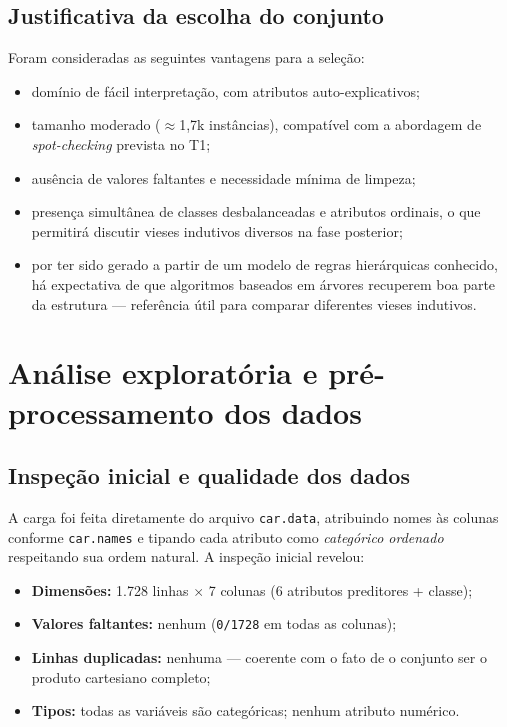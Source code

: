 \documentclass[11pt,a4paper]{article}
\newcommand{\code}[1]{\texttt{\small #1}}
\begin{document}
\subsection{Justificativa da escolha do conjunto}
Foram consideradas as seguintes vantagens para a seleção:
\begin{itemize}
\item domínio de fácil interpretação, com atributos auto-explicativos;
\item tamanho moderado ($\approx$1,7k instâncias), compatível com a abordagem de \textit{spot-checking} prevista no T1;
\item ausência de valores faltantes e necessidade mínima de limpeza;
\item presença simultânea de classes desbalanceadas e atributos ordinais, o que permitirá discutir vieses indutivos diversos na fase posterior;
\item por ter sido gerado a partir de um modelo de regras hierárquicas conhecido, há expectativa de que algoritmos baseados em árvores recuperem boa parte da estrutura --- referência útil para comparar diferentes vieses indutivos.
\end{itemize}

\section{Análise exploratória e pré-processamento dos dados}

\subsection{Inspeção inicial e qualidade dos dados}

A carga foi feita diretamente do arquivo \code{car.data}, atribuindo nomes às colunas conforme \code{car.names} e tipando cada atributo como \emph{categórico ordenado} respeitando sua ordem natural. A inspeção inicial revelou:

\begin{itemize}
\item \textbf{Dimensões:} 1.728 linhas $\times$ 7 colunas (6 atributos preditores + classe);
\item \textbf{Valores faltantes:} nenhum (\code{0/1728} em todas as colunas);
\item \textbf{Linhas duplicadas:} nenhuma --- coerente com o fato de o conjunto ser o produto cartesiano completo;
\item \textbf{Tipos:} todas as variáveis são categóricas; nenhum atributo numérico.
\end{itemize}
\end{document}
